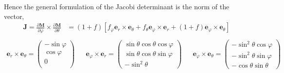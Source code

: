 Hence the general formulation of the Jacobi determinant is the norm of the vector,
\begin{align}
    \textbf{J} = 
    \frac{\partial \textbf{M}}{\partial \varphi}
    \times\frac{\partial \textbf{M}}{\partial \theta}
    &= 
    (1 + f)[
        f_\varphi \textbf{e}_r \times \textbf{e}_{\theta}
        + f_\theta  \textbf{e}_{\varphi} \times \textbf{e}_r
        + (1 + f) \textbf{e}_{\varphi}\times \textbf{e}_{\theta}
    ]\\
\end{align}
\begin{align}
    \textbf{e}_r \times \textbf{e}_\theta
    =
    \begin{pmatrix}
        -\sin\varphi\\
        \cos\varphi\\
        0\\
    \end{pmatrix}
    &&
    \textbf{e}_\varphi \times \textbf{e}_r =
    \begin{pmatrix}
        \sin\theta\cos\theta \cos\varphi\\
        \sin\theta\cos\theta \sin\varphi\\
        -\sin^2\theta
    \end{pmatrix}
    &&
    \textbf{e}_\varphi \times \textbf{e}_\theta =
    \begin{pmatrix}
        -\sin^2\theta\cos\varphi\\
        -\sin^2\theta\sin\varphi\\
        -\cos\theta\sin\theta
    \end{pmatrix}
\end{align}

